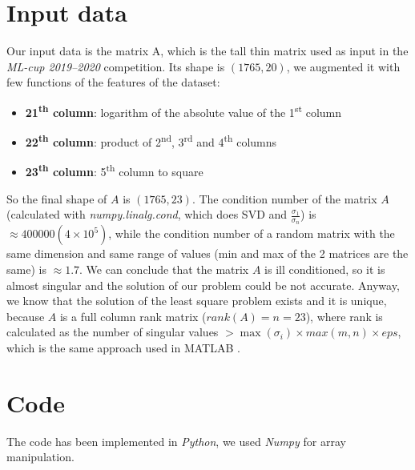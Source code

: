 \documentclass{article}
\begin{document}
\section{Input data}\label{sec:input-data}
Our input data is the matrix A, which is the tall thin matrix used as input in the \textit{ML-cup 2019--2020} competition.
Its shape is $(1765, 20)$, we augmented it with few functions of the features of the dataset:
\begin{itemize}
	\item \textbf{21\textsuperscript{th} column}: logarithm of the absolute value of the 1\textsuperscript{st} column
	\item \textbf{22\textsuperscript{th} column}: product of 2\textsuperscript{nd}, 3\textsuperscript{rd} and 4\textsuperscript{th} columns
	\item \textbf{23\textsuperscript{th} column}: 5\textsuperscript{th} column to square
\end{itemize}
So the final shape of $A$ is $(1765, 23)$.
    The condition number of the matrix $A$ (calculated with \textit{numpy.linalg.cond}, which does SVD and $\frac{\sigma_{1}}{\sigma_{n}}$) is $\approx 400000 (4 \times 10^{5})$, while the condition number of a random matrix with the same dimension and same range of values (min and max of the 2 matrices are the same) is $\approx 1.7$.
    We can conclude that the matrix $A$ is ill conditioned, so it is almost singular and the solution of our problem could be not accurate.
    Anyway, we know that the solution of the least square problem exists and it is unique, because $A$ is a full column rank matrix ($rank(A) = n = 23$), where rank is calculated as the number of singular values $> \max(\sigma_{i}) \times max(m, n) \times eps$, which is the same approach used in MATLAB .

\section{Code}\label{sec:code}
The code has been implemented in \textit{Python}, we used \textit{Numpy} for array manipulation.
\end{document}

